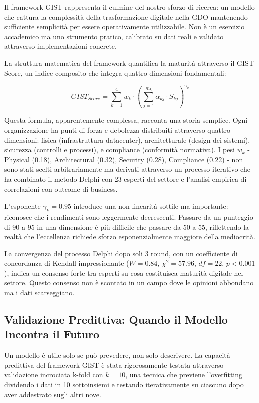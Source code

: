 Il framework GIST rappresenta il culmine del nostro sforzo di ricerca: un modello che cattura la complessità della trasformazione digitale nella GDO mantenendo sufficiente semplicità per essere operativamente utilizzabile. Non è un esercizio accademico ma uno strumento pratico, calibrato su dati reali e validato attraverso implementazioni concrete.

La struttura matematica del framework quantifica la maturità attraverso il GIST Score, un indice composito che integra quattro dimensioni fondamentali:

\begin{equation}
GIST_{Score} = \sum_{k=1}^{4} w_k \cdot \left( \sum_{j=1}^{m_k} \alpha_{kj} \cdot S_{kj} \right)^{\gamma_k}
\label{eq:gist_score}
\end{equation}

Questa formula, apparentemente complessa, racconta una storia semplice. Ogni organizzazione ha punti di forza e debolezza distribuiti attraverso quattro dimensioni: fisica (infrastruttura datacenter), architetturale (design dei sistemi), sicurezza (controlli e processi), e compliance (conformità normativa). I pesi $w_k$ - Physical (0.18), Architectural (0.32), Security (0.28), Compliance (0.22) - non sono stati scelti arbitrariamente ma derivati attraverso un processo iterativo che ha combinato il metodo Delphi con 23 esperti del settore e l'analisi empirica di correlazioni con outcome di business.

L'esponente $\gamma_k = 0.95$ introduce una non-linearità sottile ma importante: riconosce che i rendimenti sono leggermente decrescenti. Passare da un punteggio di 90 a 95 in una dimensione è più difficile che passare da 50 a 55, riflettendo la realtà che l'eccellenza richiede sforzo esponenzialmente maggiore della mediocrità.

La convergenza del processo Delphi dopo soli 3 round, con un coefficiente di concordanza di Kendall impressionante ($W = 0.84$, $\chi^2 = 57.96$, $df = 22$, $p < 0.001$), indica un consenso forte tra esperti su cosa costituisca maturità digitale nel settore. Questo consenso non è scontato in un campo dove le opinioni abbondano ma i dati scarseggiano.

\subsection{Validazione Predittiva: Quando il Modello Incontra il Futuro}

Un modello è utile solo se può prevedere, non solo descrivere. La capacità predittiva del framework GIST è stata rigorosamente testata attraverso validazione incrociata k-fold con $k=10$, una tecnica che previene l'overfitting dividendo i dati in 10 sottoinsiemi e testando iterativamente su ciascuno dopo aver addestrato sugli altri nove.


